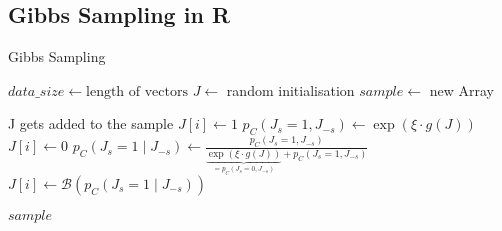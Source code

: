 \documentclass{article}
\begin{document}
\begin{algorithm}
\section{Gibbs Sampling in R}



\caption{Gibbs Sampling}
\begin{algorithmic}[1]
    \State $data\_size \gets \text{length of vectors}$
    \State $J \gets$ random initialisation
    \State $sample \gets$ new Array

            \State J gets added to the sample
            \State $J[i] \gets 1$
            \State $p_C(J_s=1, J_{-s}) \gets \exp(\xi \cdot g(J))$
            \State $J[i] \gets 0$
            \State $p_C(J_s=1 \mid J_{-s}) \gets \frac{p_C(J_s=1, J_{-s})}{\underbrace{\exp(\xi \cdot g(J))}_{=p_C(J_s=0, J_{-s})} + p_C(J_s=1, J_{-s})}$
            \State $J[i] \gets \mathcal{B}(p_C(J_s=1 \mid J_{-s}))$
        \EndFor
    \EndFor

    \State \Return $sample$
\EndFunction
\end{algorithmic}
\end{algorithm}
\end{document}
